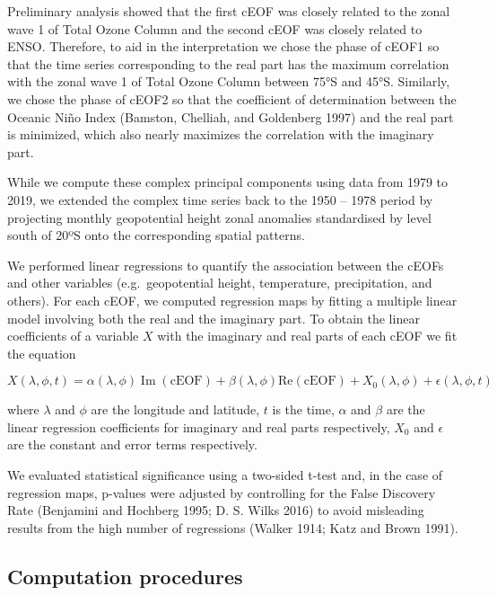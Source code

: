 \documentclass[smallextended]{svjour3}       %
\begin{document}
Preliminary analysis showed that the first cEOF was closely related to the zonal wave 1 of Total Ozone Column and the second cEOF was closely related to ENSO.
Therefore, to aid in the interpretation we chose the phase of cEOF1 so that the time series corresponding to the real part has the maximum correlation with the zonal wave 1 of Total Ozone Column between 75°S and 45°S.
Similarly, we chose the phase of cEOF2 so that the coefficient of determination between the Oceanic Niño Index (Bamston, Chelliah, and Goldenberg 1997) and the real part is minimized, which also nearly maximizes the correlation with the imaginary part.

While we compute these complex principal components using data from 1979 to 2019, we extended the complex time series back to the 1950 -- 1978 period by projecting monthly geopotential height zonal anomalies standardised by level south of 20ºS onto the corresponding spatial patterns.

We performed linear regressions to quantify the association between the cEOFs and other variables (e.g.~geopotential height, temperature, precipitation, and others).
For each cEOF, we computed regression maps by fitting a multiple linear model involving both the real and the imaginary part.
To obtain the linear coefficients of a variable \(X\) with the imaginary and real parts of each cEOF we fit the equation

\[
X(\lambda, \phi, t) = \alpha(\lambda, \phi) \operatorname{Im}(\mathrm{cEOF}) + \beta(\lambda, \phi) \mathrm{Re}(\mathrm{cEOF}) + X_0(\lambda, \phi) + \epsilon(\lambda, \phi, t)
\]

where \(\lambda\) and \(\phi\) are the longitude and latitude, \(t\) is the time, \(\alpha\) and \(\beta\) are the linear regression coefficients for imaginary and real parts respectively, \(X_0\) and \(\epsilon\) are the constant and error terms respectively.

We evaluated statistical significance using a two-sided t-test and, in the case of regression maps, p-values were adjusted by controlling for the False Discovery Rate (Benjamini and Hochberg 1995; D. S. Wilks 2016) to avoid misleading results from the high number of regressions (Walker 1914; Katz and Brown 1991).

\hypertarget{computation-procedures}{%
\subsection{Computation procedures}\label{computation-procedures}}
\end{document}
